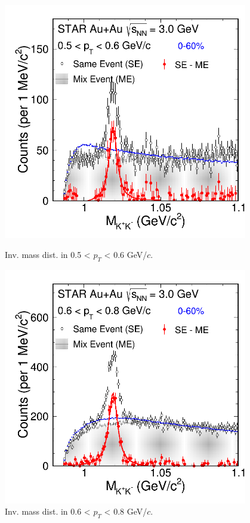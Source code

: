 \begin{figure}[htbp]
\begin{minipage}[htbp]{0.55\linewidth}
\centering
\includegraphics[width=0.95\textwidth]{chapterY/fig/fig1_signal_0_2.png}
\caption{Inv. mass dist. in 0.5 < $p_T$ < 0.6 GeV/$c$. \label{fig:mixedEvent_pT2}}
\end{minipage}
\hfill
\begin{minipage}[htbp]{0.55\linewidth}
\centering
\includegraphics[width=0.95\textwidth]{chapterY/fig/fig1_signal_0_3.png} 
\caption{Inv. mass dist. in 0.6 < $p_T$ < 0.8 GeV/$c$. \label{fig:mixedEvent_pT3}}
\end{minipage}
\end{figure}

